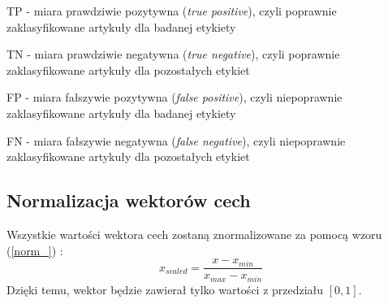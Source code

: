 \documentclass{classrep}
\begin{document}
TP - miara prawdziwie pozytywna (\textsl{true positive}), czyli poprawnie zaklasyfikowane artykuły dla badanej etykiety 

TN - miara prawdziwie negatywna (\textsl{true negative}), czyli poprawnie zaklasyfikowane artykuły dla pozostałych etykiet

FP - miara fałszywie pozytywna (\textsl{false positive}), czyli niepoprawnie zaklasyfikowane artykuły dla badanej etykiety 

FN - miara fałszywie negatywna (\textsl{false negative}), czyli niepoprawnie zaklasyfikowane artykuły dla pozostałych etykiet
\subsection{Normalizacja wektorów cech}
Wszystkie wartości wektora cech zostaną znormalizowane za pomocą wzoru (\ref{norm_}) \cite{norm}:
\begin{equation} \label{norm_} x_{scaled} = \frac{x - x_{min}}{x_{max} - x_{min}}  \end{equation}
Dzięki temu, wektor będzie zawierał tylko wartości z przedziału $[0,1]$.
\end{document}
